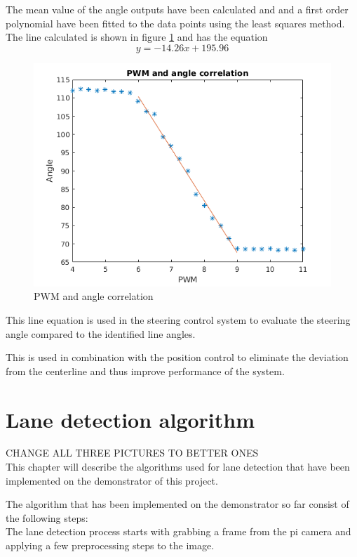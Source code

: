 The mean value of the angle outputs have been calculated and and a first order polynomial have been fitted to the data points using the least squares method. The line calculated is shown in figure  \ref{fig:PWM and angle correlation} and has the equation $$ y=-14.26x + 195.96$$

\begin{figure}[H]
  \includegraphics[width=\textwidth]{./img/PWMPLOT_2.png}
  \centering
  \caption{PWM and angle correlation}
  \label{fig:PWM and angle correlation}
\end{figure}

This line equation is used in the steering control system to evaluate the steering angle compared to the identified line angles.

This is used in combination with the position control to eliminate the deviation from the centerline and thus improve performance of the system.


\section{Lane detection algorithm}
CHANGE ALL THREE PICTURES TO BETTER ONES\\

This chapter will describe the algorithms used for lane detection that have been implemented on the demonstrator of this project. 

The algorithm that has been implemented on the demonstrator so far consist of the following steps:\\

The lane detection process starts with grabbing a frame from the pi camera and applying a few preprocessing steps to the image.\\

